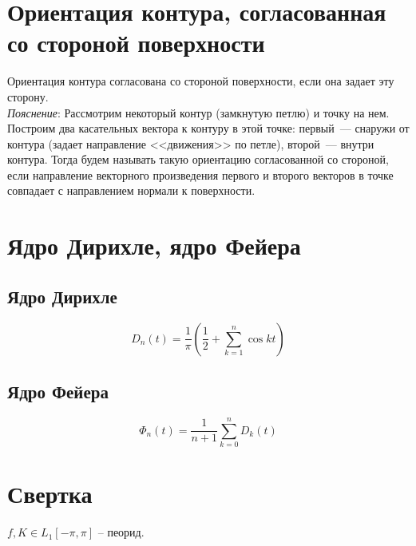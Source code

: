 \documentclass[paper=a4, fontsize=14pt]{report}
\begin{document}
	\section{Ориентация контура, согласованная со стороной поверхности}

	Ориентация контура согласована со стороной поверхности, если она задает эту сторону.\\

	\emph{Пояснение}:
	Рассмотрим некоторый контур (замкнутую петлю) и точку на нем. Построим два касательных вектора к контуру в этой точке: первый~--- снаружи от контура (задает направление <<движения>> по петле), второй~--- внутри контура. Тогда будем называть такую ориентацию согласованной со стороной, если направление векторного произведения первого и второго векторов в точке совпадает с направлением нормали к поверхности.

	\begin{center}
	\end{center}

	\section{Ядро Дирихле, ядро Фейера}

	\subsection{Ядро Дирихле}

	$$ D_n(t) = \frac{1}{\pi}( \frac{1}{2} + \sum_{k = 1}^{n} \cos kt) $$

	\subsection{Ядро Фейера}

	$$ \Phi_n(t) = \frac{1}{n+1} \sum_{k = 0}^{n} D_k(t) $$

	\section{Свертка}

	$ f, K \in L_1[-\pi, \pi]$  -- пеорид.
\end{document}

